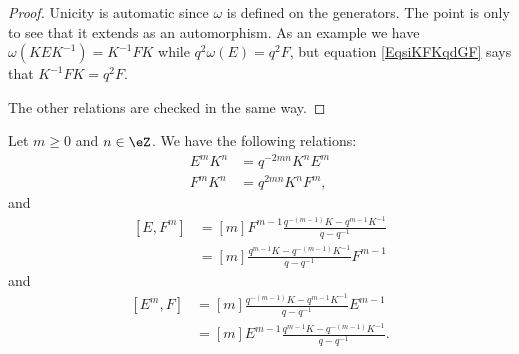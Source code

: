 \begin{proof}
	Unicity is automatic since \( \omega\) is defined on the generators. The point is only to see that it extends as an automorphism. As an example we have \( \omega(KEK^{-1})=K^{-1}FK\) while \( q^2\omega(E)=q^2F\), but equation \eqref{EqsiKFKqdGF} says that \( K^{-1}FK=q^2F\).

	The other relations are checked in the same way.
\end{proof}

\begin{lemma}
	Let \( m\geq 0\) and \( n\in\eZ\). We have the following relations:
	\begin{subequations}
		\begin{align}
			E^mK^n & =q^{-2mn}K^nE^m     \label{EqComUqslEmKn} \\
			F^mK^n & =q^{2mn}K^nF^m,
		\end{align}
	\end{subequations}
	and
	\begin{subequations}
		\begin{align}
			[E,F^m] & =[m]F^{m-1}\frac{ q^{-(m-1)}K-q^{m-1}K^{-1} }{ q-q^{-1} }       \label{EqComUqslEFm} \\
			        & =[m]\frac{ q^{m-1}K-q^{-(m-1)}K^{-1} }{ q-q^{-1} }F^{m-1}      \label{EqComUqslEFmb}
		\end{align}
	\end{subequations}
	and
	\begin{subequations}
		\begin{align}
			[E^m,F] & =[m]\frac{ q^{-(m-1)}K-q^{m-1}K^{-1} }{ q-q^{-1} }E^{m-1}  \\
			        & =[m]E^{m-1}\frac{ q^{m-1}K-q^{-(m-1)}K^{-1} }{ q-q^{-1} }.
		\end{align}
	\end{subequations}
\end{lemma}

